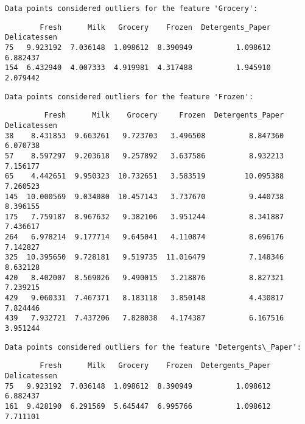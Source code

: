 \documentclass[11pt]{article}
\begin{document}
    
    \begin{Verbatim}[commandchars=\\\{\}]
Data points considered outliers for the feature 'Grocery':

    \end{Verbatim}

    
    \begin{verbatim}
        Fresh      Milk   Grocery    Frozen  Detergents_Paper  Delicatessen
75   9.923192  7.036148  1.098612  8.390949          1.098612      6.882437
154  6.432940  4.007333  4.919981  4.317488          1.945910      2.079442
    \end{verbatim}

    
    \begin{Verbatim}[commandchars=\\\{\}]
Data points considered outliers for the feature 'Frozen':

    \end{Verbatim}

    
    \begin{verbatim}
         Fresh      Milk    Grocery     Frozen  Detergents_Paper  Delicatessen
38    8.431853  9.663261   9.723703   3.496508          8.847360      6.070738
57    8.597297  9.203618   9.257892   3.637586          8.932213      7.156177
65    4.442651  9.950323  10.732651   3.583519         10.095388      7.260523
145  10.000569  9.034080  10.457143   3.737670          9.440738      8.396155
175   7.759187  8.967632   9.382106   3.951244          8.341887      7.436617
264   6.978214  9.177714   9.645041   4.110874          8.696176      7.142827
325  10.395650  9.728181   9.519735  11.016479          7.148346      8.632128
420   8.402007  8.569026   9.490015   3.218876          8.827321      7.239215
429   9.060331  7.467371   8.183118   3.850148          4.430817      7.824446
439   7.932721  7.437206   7.828038   4.174387          6.167516      3.951244
    \end{verbatim}

    
    \begin{Verbatim}[commandchars=\\\{\}]
Data points considered outliers for the feature 'Detergents\_Paper':

    \end{Verbatim}

    
    \begin{verbatim}
        Fresh      Milk   Grocery    Frozen  Detergents_Paper  Delicatessen
75   9.923192  7.036148  1.098612  8.390949          1.098612      6.882437
161  9.428190  6.291569  5.645447  6.995766          1.098612      7.711101
    \end{verbatim}
\end{document}
